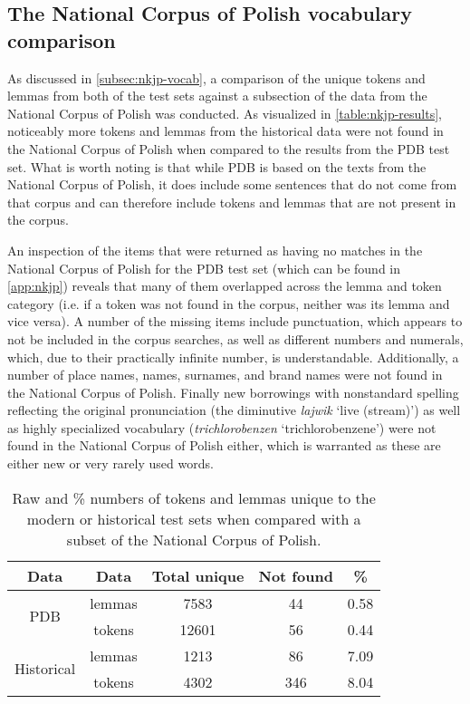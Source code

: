 \subsection{The National Corpus of Polish vocabulary comparison}
\label{subsec:nkjp-comparison-results}

As discussed in \autoref{subsec:nkjp-vocab}, a comparison of the unique tokens and lemmas from both of the test sets against a subsection of the data from the National Corpus of Polish was conducted. As visualized in \autoref{table:nkjp-results}, noticeably more tokens and lemmas from the historical data were not found in the National Corpus of Polish when compared to the results from the PDB test set. What is worth noting is that while PDB is based on the texts from the National Corpus of Polish, it does include some sentences that do not come from that corpus and can therefore include tokens and lemmas that are not present in the corpus. 

An inspection of the items that were returned as having no matches in the National Corpus of Polish for the PDB test set (which can be found in \autoref{app:nkjp}) reveals that many of them overlapped across the lemma and token category (i.e. if a token was not found in the corpus, neither was its lemma and vice versa). A number of the missing items include punctuation, which appears to not be included in the corpus searches, as well as different numbers and numerals, which, due to their practically infinite number, is understandable. Additionally, a number of place names, names, surnames, and brand names were not found in the National Corpus of Polish. Finally new borrowings with nonstandard spelling reflecting the original pronunciation (the diminutive \textit{lajwik} `live (stream)') as well as highly specialized vocabulary (\textit{trichlorobenzen} `trichlorobenzene') were not found in the National Corpus of Polish either, which is warranted as these are either new or very rarely used words.

\renewcommand{\arraystretch}{1.25}
\begin{table}[H]
\begin{center}
\begin{tabular}{|cc|c|c|c|}
\hline \bf Data & \bf Data & \bf Total unique & \bf Not found & \bf \% \\ \hline
\multirow{2}{4em}{PDB}
& lemmas & 7583 & 44 & 0.58  \\
& tokens & 12601 & 56 & 0.44  \\
\multirow{2}{4em}{Historical}
& lemmas & 1213 & 86 & 7.09  \\
& tokens & 4302 & 346 & 8.04 \\ 
\hline
\end{tabular}
\caption{\label{table:nkjp-results} Raw and \% numbers of tokens and lemmas unique to the modern or historical test sets when compared with a subset of the National Corpus of Polish.}
\end{center}
\end{table}


